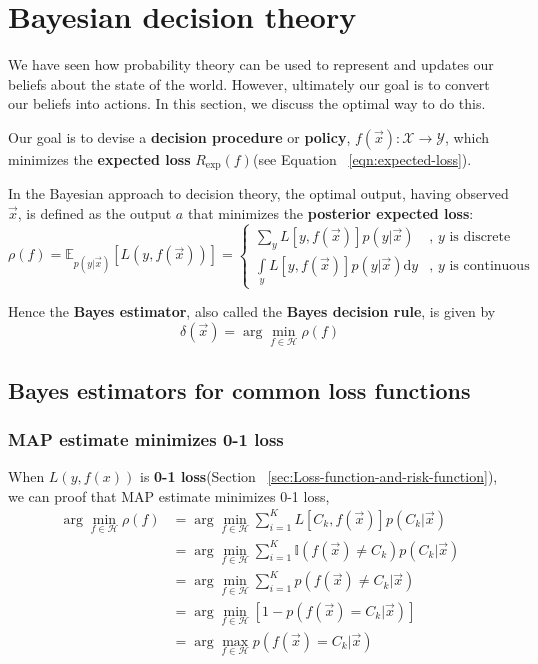 \section{Bayesian decision theory}
\label{sec:Bayesian-decision-theory}
We have seen how probability theory can be used to represent and updates our beliefs about the state of the world. However, ultimately our goal is to convert our beliefs into actions. In this section, we discuss the optimal way to do this.

Our goal is to devise a \textbf{decision procedure} or \textbf{policy}, $f(\vec{x}) : \mathcal{X} \rightarrow \mathcal{Y}$, which minimizes the \textbf{expected loss} $R_{\mathrm{exp}}(f)$(see Equation ~\eqref{eqn:expected-loss}).

In the Bayesian approach to decision theory, the optimal output, having observed $\vec{x}$, is defined as the output $a$ that minimizes the \textbf{posterior expected loss}:
\begin{equation}
\rho(f)=\mathbb{E}_{p(y|\vec{x})}[L(y,f(\vec{x}))]=\begin{cases}
\sum\limits_y L[y,f(\vec{x})]p(y|\vec{x}) & \text{, $y$ is discrete}\\
\int\limits_y L[y,f(\vec{x})]p(y|\vec{x})\mathrm{d}y & \text{, $y$ is continuous}
\end{cases}
\end{equation}

Hence the \textbf{Bayes estimator}, also called the \textbf{Bayes decision rule}, is given by
\begin{equation}
\delta(\vec{x})=\arg\min\limits_{f \in \mathcal{H}} \rho(f)
\end{equation}


\subsection{Bayes estimators for common loss functions}


\subsubsection{MAP estimate minimizes 0-1 loss}
When $L(y,f(x))$ is \textbf{0-1 loss}(Section ~\ref{sec:Loss-function-and-risk-function}), we can proof that MAP estimate minimizes 0-1 loss, 
\begin{align*}
\arg\min\limits_{f \in \mathcal{H}} \rho(f)& =\arg\min\limits_{f \in \mathcal{H}} \sum\limits_{i=1}^K{L[C_k,f(\vec{x})]p(C_k|\vec{x})} \\
         & =\arg\min\limits_{f \in \mathcal{H}} \sum\limits_{i=1}^K{\mathbb{I}(f(\vec{x}) \neq C_k)p(C_k|\vec{x})} \\
		 & =\arg\min\limits_{f \in \mathcal{H}} \sum\limits_{i=1}^K{p(f(\vec{x}) \neq C_k|\vec{x})} \\
		 & =\arg\min\limits_{f \in \mathcal{H}} \left[1-{p(f(\vec{x}) = C_k|\vec{x})}\right] \\
		 & =\arg\max\limits_{f \in \mathcal{H}} p(f(\vec{x}) = C_k|\vec{x})
\end{align*}


